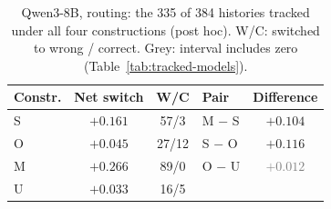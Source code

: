 \begin{table}[t]
\centering
\small
\begin{tabular}{@{}lcclc@{}}
\toprule
Constr. & Net switch & W/C & Pair & Difference \\
\midrule
S & $+0.161$ & 57/3 & M $-$ S & $+0.104$ \\
O & $+0.045$ & 27/12 & S $-$ O & $+0.116$ \\
M & $+0.266$ & 89/0 & O $-$ U & \textcolor{gray}{$+0.012$} \\
U & $+0.033$ & 16/5 &  &  \\
\bottomrule
\end{tabular}
\caption{Qwen3-8B, routing: the 335 of 384 histories tracked under all four constructions (post hoc). W/C: switched to wrong / correct. Grey: interval includes zero (Table~\ref{tab:tracked-models}).}
\label{tab:tracked}
\end{table}
